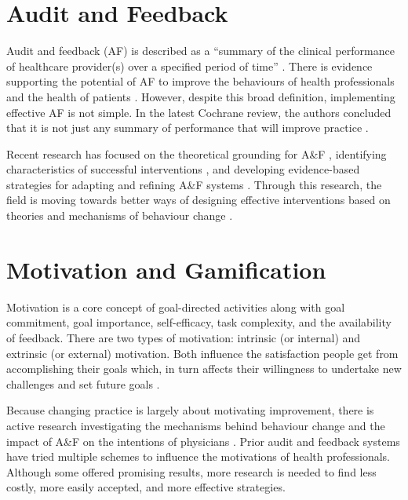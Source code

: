 \section{Audit and Feedback}
Audit and feedback (\gls{AF}) is described as a ``summary of the clinical performance of healthcare provider(s) over a specified period of time'' \cite{ivers2012audit}. There is evidence supporting the potential of  \gls{AF} to improve the behaviours of health professionals  and the health of patients \cite{ivers2012audit}. However, despite this broad definition, implementing effective \gls{AF} is not simple. In the latest Cochrane review, the authors concluded that it is not just any summary of performance that will improve practice \cite{ivers2012audit}.

Recent research has focused on the theoretical grounding for A\&F
\cite{hysong2017theory, brown2019clinical, landis2015computer}, identifying characteristics of successful interventions \cite{ivers2012audit, colquhoun2013systematic, tuti2017systematic}, and developing evidence-based strategies for adapting and refining A\&F systems \cite{brehaut2016practice, mcnamara2016confidential}. Through this research, the field is moving towards better ways of designing effective interventions based on theories and mechanisms of behaviour change \cite{colquhoun2017advancing}.

\section{Motivation and Gamification}
Motivation is a core concept of goal-directed activities along with goal commitment, goal importance, self-efficacy, task complexity, and the availability of feedback. There are two types of motivation: intrinsic (or internal) and extrinsic (or external) motivation. Both influence the satisfaction people get from accomplishing their goals which, in turn affects their willingness to undertake new challenges and set future goals  \cite{locke2002building}.

Because changing practice is largely about motivating improvement, there is active research investigating the mechanisms behind behaviour change \cite{michie2011behaviour}  and the impact of A\&F on the intentions of physicians \cite{gude2018health}. Prior audit and feedback systems have tried multiple schemes to influence the motivations of health professionals. Although some offered promising results, more research is needed to find less costly, more easily accepted, and more effective strategies.

